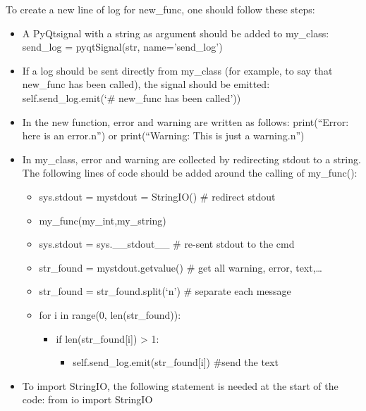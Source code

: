 \documentclass[letterpaper,10pt,english]{sphinxmanual}
\begin{document}
To create a new line of log for new\_func, one should follow these steps:
\begin{itemize}
\item {} 
A PyQtsignal with a string as argument should be added to my\_class: send\_log = pyqtSignal(str, name='send\_log')

\item {} 
If a log should be sent directly from my\_class (for example, to say that new\_func  has been called), the signal should be emitted: self.send\_log.emit(`\# new\_func has been called'))

\item {} 
In the new function,  error and warning are written as follows: print(“Error: here is an error.n”) or print(“Warning:  This is just a warning.n”)

\item {} 
In my\_class, error and warning are collected by redirecting stdout to a string. The following lines of code should be added around the calling of my\_func():
\begin{itemize}
\item {} 
sys.stdout = mystdout = StringIO()  \# redirect stdout

\item {} 
my\_func(my\_int,my\_string)

\item {} 
sys.stdout = sys.\_\_stdout\_\_   \# re-sent stdout to the cmd

\item {} 
str\_found = mystdout.getvalue()   \# get all warning, error, text,…

\item {} 
str\_found = str\_found.split(`n')  \# separate each message

\item {} 
for i in range(0, len(str\_found)):
\begin{itemize}
\item {} 
if len(str\_found{[}i{]}) \textgreater{} 1:
\begin{itemize}
\item {} 
self.send\_log.emit(str\_found{[}i{]})  \#send the text

\end{itemize}

\end{itemize}

\end{itemize}

\item {} 
To import StringIO, the following statement is needed at the start of the code: from io import StringIO


\end{itemize}
\end{document}
